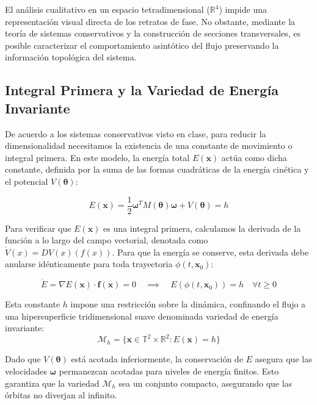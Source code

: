 \documentclass[13pt]{extarticle}
\begin{document}
El análisis cualitativo en un espacio tetradimensional ($\mathbb{R}^4$) impide una representación visual directa de los retratos de fase. No obstante, mediante la teoría de sistemas conservativos y la construcción de secciones transversales, es posible caracterizar el comportamiento asintótico del flujo preservando la información topológica del sistema.

\subsection{Integral Primera y la Variedad de Energía Invariante}

De acuerdo a los sistemas conservativos visto en clase, para reducir la dimensionalidad necesitamos la existencia de una constante de movimiento o integral primera. En este modelo, la energía total $E(\mathbf{x})$ actúa como dicha constante, definida por la suma de las formas cuadráticas de la energía cinética y el potencial $V(\boldsymbol{\theta})$:

\begin{equation}
    E(\mathbf{x}) = \frac{1}{2} \boldsymbol{\omega}^T M(\boldsymbol{\theta}) \boldsymbol{\omega} + V(\boldsymbol{\theta}) = h
\end{equation}

Para verificar que $E(\mathbf{x})$ es una integral primera, calculamos la derivada de la función a lo largo del campo vectorial, denotada como $\dot{V}(x) = DV(x)(f(x))$. Para que la energía se conserve, esta derivada debe anularse idénticamente para toda trayectoria $\phi(t, \mathbf{x}_0)$:

\begin{equation}
    \dot{E} = \nabla E(\mathbf{x}) \cdot \mathbf{f}(\mathbf{x}) = 0 \quad \implies \quad E(\phi(t, \mathbf{x}_0)) = h \quad \forall t \geq 0
\end{equation}

Esta constante $h$ impone una restricción sobre la dinámica, confinando el flujo a una hipersuperficie tridimensional suave denominada variedad de energía invariante:
\begin{equation}
    \mathcal{M}_{h} = \{ \mathbf{x} \in \mathbb{T}^2 \times \mathbb{R}^2 : E(\mathbf{x}) = h \}
\end{equation}

Dado que $V(\boldsymbol{\theta})$ está acotada inferiormente, la conservación de $E$ asegura que las velocidades $\boldsymbol{\omega}$ permanezcan acotadas para niveles de energía finitos. Esto garantiza que la variedad $\mathcal{M}_{h}$ sea un conjunto compacto, asegurando que las órbitas no diverjan al infinito.
\end{document}
